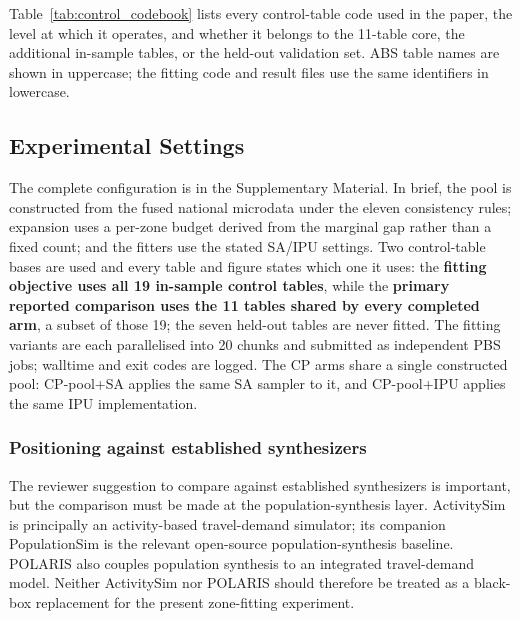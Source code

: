 \documentclass[review]{elsarticle}
\begin{document}
Table~\ref{tab:control_codebook} lists every control-table code used in the paper, the level at which it operates, and whether it belongs to the 11-table core, the additional in-sample tables, or the held-out validation set. ABS table names are shown in uppercase; the fitting code and result files use the same identifiers in lowercase.



\subsection{Experimental Settings}
\label{sec:expsettings}
The complete configuration is in the Supplementary Material. In brief, the pool is constructed from the fused national microdata under the eleven consistency rules; expansion uses a per-zone budget derived from the marginal gap rather than a fixed count; and the fitters use the stated SA/IPU settings. Two control-table bases are used and every table and figure states which one it uses: the \textbf{fitting objective uses all 19 in-sample control tables}, while the \textbf{primary reported comparison uses the 11 tables shared by every completed arm}, a subset of those 19; the seven held-out tables are never fitted. The fitting variants are each parallelised into 20 chunks and submitted as independent PBS jobs; walltime and exit codes are logged. The CP arms share a single constructed pool: CP-pool+SA applies the same SA sampler to it, and CP-pool+IPU applies the same IPU implementation.

\subsubsection{Positioning against established synthesizers}
\label{sec:external_baselines}
The reviewer suggestion to compare against established synthesizers is important, but the
comparison must be made at the population-synthesis layer. ActivitySim is principally an
activity-based travel-demand simulator; its companion PopulationSim is the relevant
open-source population-synthesis baseline. POLARIS also couples population synthesis to
an integrated travel-demand model. Neither ActivitySim nor POLARIS should therefore be
treated as a black-box replacement for the present zone-fitting experiment.
\end{document}
